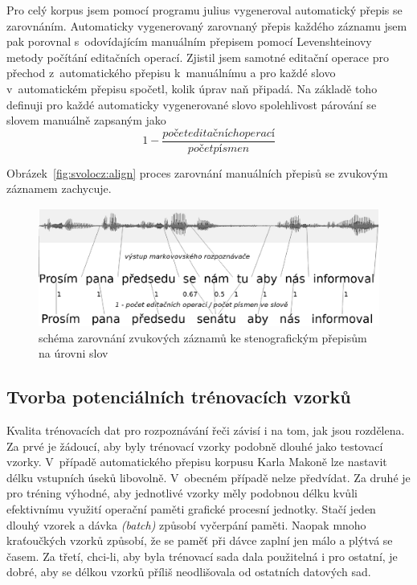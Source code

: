 Pro celý korpus jsem pomocí programu julius vygeneroval automatický přepis se
zarovnáním. Automaticky vygenerovaný zarovnaný přepis každého záznamu jsem pak
porovnal s~odovídajícím manuálním přepisem pomocí Levenshteinovy metody počítání
editačních operací. Zjistil jsem samotné editační operace pro přechod
z~automatického přepisu k~manuálnímu a pro každé slovo v~automatickém přepisu
spočetl, kolik úprav naň připadá. Na základě toho definuji pro každé automaticky
vygenerované slovo spolehlivost párování se slovem manuálně zapsaným jako
\begin{equation}1 - \frac{počet editačních operací}{počet písmen}\end{equation}

Obrázek~\ref{fig:svolocz:align} proces zarovnání manuálních přepisů se zvukovým
záznamem zachycuje.

\begin{figure}[htpb]
\includegraphics[scale=0.4]{rc/svolocz-align.eps}
\caption{schéma zarovnání zvukových záznamů ke stenografickým přepisům na úrovni
slov}
\label{fig:align}
\end{figure}

\subsection{Tvorba potenciálních trénovacích vzorků}

Kvalita trénovacích dat pro rozpoznávání řeči závisí i na tom, jak jsou
rozdělena. Za prvé je žádoucí, aby byly trénovací vzorky podobně dlouhé
jako testovací vzorky\cite{nagorski2003search}.
V~případě automatického přepisu korpusu Karla Makoně lze
nastavit délku vstupních úseků libovolně. V~obecném případě nelze předvídat.
Za druhé je pro tréning výhodné, aby jednotlivé vzorky měly podobnou délku kvůli
efektivnímu využití operační paměti grafické procesní jednotky. Stačí jeden
dlouhý vzorek a dávka {\em (batch)} způsobí vyčerpání paměti. Naopak mnoho
kraťoučkých vzorků způsobí, že se paměť při dávce zaplní jen málo a plýtvá se
časem. Za třetí, chci-li, aby byla trénovací sada dala použitelná i pro ostatní,
je dobré, aby se délkou vzorků příliš neodlišovala od ostatních datových sad.

